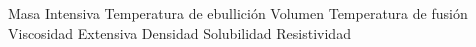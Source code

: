 \begin{minipage}{0.4\linewidth}
    \checkboxchar{ {\color{cadmiumorange}
                $\Box$}
    }
    \begin{checkboxes}
        \choice Masa \vspace{0.5cm}
        \choice Intensiva\vspace{0.5cm}
        \choice Temperatura de ebullici\'on    \vspace{0.5cm}
        \choice Volumen    \vspace{0.5cm}
        \choice Temperatura de fusi\'on    \vspace{0.5cm}
        \choice Viscosidad  \vspace{0.5cm}
        \choice Extensiva \vspace{0.5cm}
        \choice Densidad \vspace{0.5cm}
        \choice Solubilidad \vspace{0.5cm}
        \choice Resistividad
    \end{checkboxes}

\end{minipage}